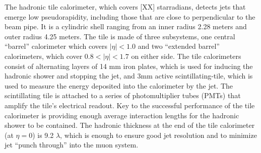 
The hadronic tile calorimeter, which covers [XX] starradians, detects jets that emerge low pseudorapidity, including those that are close to perpendicular to the beam pipe.
It is a cylindric shell ranging from an inner radius 2.28 meters and outer radius 4.25 meters.
The tile is made of three subsystems, one central ``barrel'' calorimeter which covers $|\eta| < 1.0$ and two ``extended barrel'' calorimeters, which cover $0.8 < |\eta| < 1.7$ on either side.
The tile calorimeters consist of alternating layers of 14 mm iron plates, which is used for inducing the hadronic shower and stopping the jet, and 3mm active scintillating-tile, which is used to measure the energy deposited into the calorimeter by the jet.
The scintillating tile is attached to a series of photomultiplier tubes (PMTs) that amplify the tile's electrical readout.
Key to the successful performance of the tile calorimeter is providing enough average interaction lengths for the hadronic shower to be contained.
The hadronic thickness at the end of the tile calorimeter (at $\eta=0$) is 9.2 $\lambda$, which is enough to ensure good jet resolution and to minimize jet ``punch through'' into the muon system.


